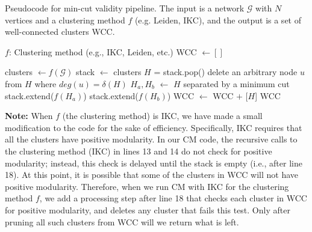 \documentclass[a4paper]{article}   	%
\begin{document}
\clearpage
\begin{algorithm}[h]
\caption{Pseudocode for min-cut validity pipeline. The input is a network $\mathcal{G}$ with $N$ vertices and a clustering method $f$ (e.g. Leiden, IKC), and the output is a set of well-connected clusters WCC.}
\begin{algorithmic}[2]
\State $f$: Clustering method (e.g., IKC, Leiden, etc.)
\State WCC $\gets []$ 

\State clusters $\gets f(\mathcal{G})$ 
\State stack $\gets$ clusters
 
    \State $H$ = stack.pop()
    \State delete an arbitrary node $u$ from $H$ where $deg(u) = \delta(H)$
    \EndWhile
     
        \State $H_a, H_b$ $\gets$ $H$ separated by a minimum cut
        \State stack.extend($f(H_a)$) 
        \State stack.extend($f(H_b)$)  
    \Else
            \State WCC $\gets$ WCC $+$ [$H$] 
        \EndIf
\EndWhile
\State \Return WCC 
\EndFunction
\end{algorithmic}

\label{alg:full-pipeline}
\end{algorithm}

\textbf{Note:} When
$f$ (the clustering method) is IKC, we have made a small modification to the
code for the sake of efficiency.
Specifically, IKC requires that all the clusters have positive modularity.
 In our CM code, the recursive
calls to the clustering method (IKC) in lines 13 and 14 do not check for positive modularity; instead, this check is delayed until the stack is empty (i.e., after line 18).
At this point, it is possible that some of the clusters in WCC will not have positive modularity.
Therefore, when we run CM with IKC for the clustering method $f$,  we add a processing step after line 18 that checks each cluster in WCC for positive modularity,
and deletes any cluster that fails this test.
Only after pruning all such clusters from WCC will we return what is left.

\clearpage
\end{document}
